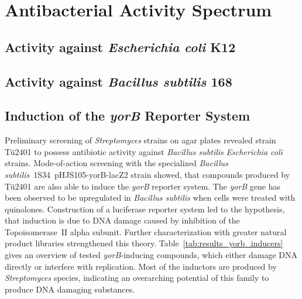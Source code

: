 


\section{Antibacterial Activity Spectrum} %
\label{sec:antibacterial_activity_spectrum}


\subsection{Activity against \textit{Escherichia coli} K12} %
\label{sub:activity_against_e_coli}


\subsection{Activity against \textit{Bacillus subtilis} 168} %
\label{sub:activity_against_b_subtilis}


\subsection{Induction of the \textit{yorB} Reporter System} %
\label{sub:induction_of_the_yorb_reporter_system}

Preliminary screening of \emph{Streptomyces} strains on agar plates revealed strain Tü2401 to possess antibiotic activity against \emph{Bacillus subtilis} \emph{Escherichia coli} strains.
Mode-of-action screening with the specialized \textit{Bacillus subtilis}~1S34~pHJS105-yorB-lacZ2 strain showed, that compounds produced by Tü2401 are also able to induce the \emph{yorB} reporter system.
The \textit{yorB} gene has been observed to be upregulated in \textit{Bacillus subtilis} when cells were treated with quinolones.\autocite{Hutter2004a}
Construction of a luciferase reporter system led to the hypothesis, that induction is due to DNA damage caused by inhibition of the Topoisomerase~II alpha subunit.\autocite{Hutter2004}
Further characterization with greater natural product libraries strengthened this theory.\autocite{Mariner2011,Urban2007}
Table~\ref{tab:results_yorb_inducers} gives an overview of tested \textit{yorB}-inducing compounds, which either damage DNA directly or interfere with replication.
Most of the inductors are produced by \textit{Streptomyces} species, indicating an overarching potential of this family to produce DNA damaging substances.

